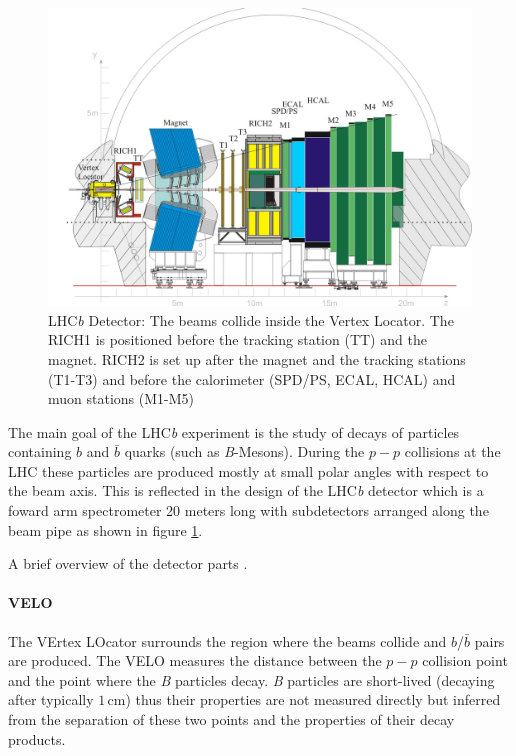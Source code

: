 \documentclass[11pt]{scrreprt}
\begin{document}
\begin{figure}[tb]
  \centering
  \includegraphics[width=\textwidth]{pics/lhcb_detector}
  \caption[LHC\textit{b} detector]{LHC\textit{b} Detector: The beams collide inside the Vertex Locator. The RICH1 is positioned before the tracking station (TT) and
  the magnet. RICH2 is set up after the magnet and the tracking stations (T1-T3) and before the calorimeter (SPD/PS, ECAL, HCAL) and muon stations (M1-M5)}
  \label{fig:lhcb}
\end{figure}

The main goal of the LHC\textit{b} experiment is the study of decays of particles containing $b$ and $\bar{b}$ quarks (such as \textit{B}-Mesons). During the $p-p$ collisions at the LHC these particles 
are produced mostly at small polar angles with respect to the beam axis. This is reflected in the design of the LHC\textit{b} detector 
which is a foward arm spectrometer 20 meters long with subdetectors arranged along the beam pipe as shown in figure \ref{fig:lhcb}.

A brief overview of the detector parts \parencite{lhcbweb}.

\paragraph{VELO} The VErtex LOcator surrounds the region where the beams collide and $b$/$\bar{b}$ pairs are produced. The VELO measures the 
distance between the $p-p$ collision point and the point where the \textit{B} particles decay. \textit{B} particles are short-lived (decaying after typically
$1$\,cm) thus their properties are not measured directly but inferred from the separation of these two points and the properties of 
their decay products.
\end{document}
